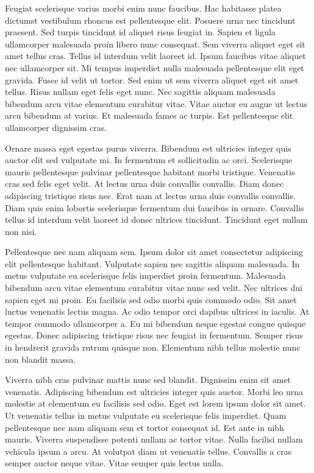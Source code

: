 \documentclass[11pt,a4paper]{article}
\begin{document}
Feugiat scelerisque varius morbi enim nunc faucibus. Hac habitasse platea dictumst vestibulum rhoncus est pellentesque elit. Posuere urna nec tincidunt praesent. Sed turpis tincidunt id aliquet risus feugiat in. Sapien et ligula ullamcorper malesuada proin libero nunc consequat. Sem viverra aliquet eget sit amet tellus cras. Tellus id interdum velit laoreet id. Ipsum faucibus vitae aliquet nec ullamcorper sit. Mi tempus imperdiet nulla malesuada pellentesque elit eget gravida. Fusce id velit ut tortor. Sed enim ut sem viverra aliquet eget sit amet tellus. Risus nullam eget felis eget nunc. Nec sagittis aliquam malesuada bibendum arcu vitae elementum curabitur vitae. Vitae auctor eu augue ut lectus arcu bibendum at varius. Et malesuada fames ac turpis. Est pellentesque elit ullamcorper dignissim cras.

Ornare massa eget egestas purus viverra. Bibendum est ultricies integer quis auctor elit sed vulputate mi. In fermentum et sollicitudin ac orci. Scelerisque mauris pellentesque pulvinar pellentesque habitant morbi tristique. Venenatis cras sed felis eget velit. At lectus urna duis convallis convallis. Diam donec adipiscing tristique risus nec. Erat nam at lectus urna duis convallis convallis. Diam quis enim lobortis scelerisque fermentum dui faucibus in ornare. Convallis tellus id interdum velit laoreet id donec ultrices tincidunt. Tincidunt eget nullam non nisi.

Pellentesque nec nam aliquam sem. Ipsum dolor sit amet consectetur adipiscing elit pellentesque habitant. Vulputate sapien nec sagittis aliquam malesuada. In metus vulputate eu scelerisque felis imperdiet proin fermentum. Malesuada bibendum arcu vitae elementum curabitur vitae nunc sed velit. Nec ultrices dui sapien eget mi proin. Eu facilisis sed odio morbi quis commodo odio. Sit amet luctus venenatis lectus magna. Ac odio tempor orci dapibus ultrices in iaculis. At tempor commodo ullamcorper a. Eu mi bibendum neque egestas congue quisque egestas. Donec adipiscing tristique risus nec feugiat in fermentum. Semper risus in hendrerit gravida rutrum quisque non. Elementum nibh tellus molestie nunc non blandit massa.

Viverra nibh cras pulvinar mattis nunc sed blandit. Dignissim enim sit amet venenatis. Adipiscing bibendum est ultricies integer quis auctor. Morbi leo urna molestie at elementum eu facilisis sed odio. Eget est lorem ipsum dolor sit amet. Ut venenatis tellus in metus vulputate eu scelerisque felis imperdiet. Quam pellentesque nec nam aliquam sem et tortor consequat id. Est ante in nibh mauris. Viverra suspendisse potenti nullam ac tortor vitae. Nulla facilisi nullam vehicula ipsum a arcu. At volutpat diam ut venenatis tellus. Convallis a cras semper auctor neque vitae. Vitae semper quis lectus nulla.
\end{document}
